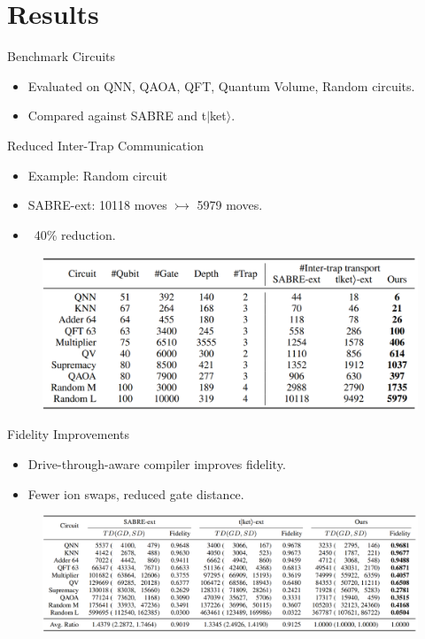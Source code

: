 \documentclass{beamer}
\begin{document}
	\section{Results}
	\begin{frame}{Benchmark Circuits}
		\begin{itemize}
			\item Evaluated on QNN, QAOA, QFT, Quantum Volume, Random circuits.
			\item Compared against SABRE and t$|$ket$\rangle$.
		\end{itemize}
	\end{frame}
	
	\begin{frame}{Reduced Inter-Trap Communication}
		\begin{itemize}
			\item Example: Random circuit
			\item SABRE-ext: 10118 moves $\rightarrowtail$ 5979 moves.
			\item ~40\% reduction.
		\end{itemize}
		\begin{figure}
			\includegraphics[width=.8\textwidth]{figure/com.png}
		\end{figure}
	\end{frame}
	
	\begin{frame}{Fidelity Improvements}
		\begin{itemize}
			\item Drive-through-aware compiler improves fidelity.
			\item Fewer ion swaps, reduced gate distance.
		\end{itemize}
		\begin{figure}
			\includegraphics[width=.8\textwidth]{figure/fid.png}
		\end{figure}
	\end{frame}
	
\end{document}
